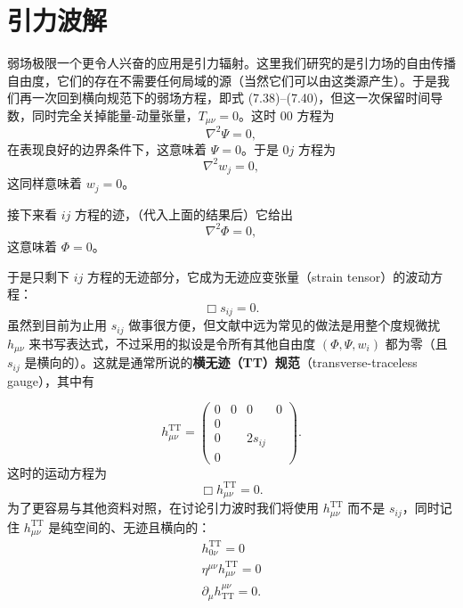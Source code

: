 \section{引力波解}

弱场极限一个更令人兴奋的应用是引力辐射。这里我们研究的是引力场的自由传播自由度，它们的存在不需要任何局域的源（当然它们可以由这类源产生）。于是我们再一次回到横向规范下的弱场方程，即式 (7.38)--(7.40)，但这一次保留时间导数，同时完全关掉能量-动量张量，$T_{\mu\nu} = 0$。这时 00 方程为
\begin{equation*}
\nabla^2\Psi = 0,
\tag{7.86}
\end{equation*}
在表现良好的边界条件下，这意味着 $\Psi = 0$。于是 $0j$ 方程为
\begin{equation*}
\nabla^2 w_j = 0,
\tag{7.87}
\end{equation*}
这同样意味着 $w_j = 0$。

接下来看 $ij$ 方程的迹，（代入上面的结果后）它给出
\begin{equation*}
\nabla^2\Phi = 0,
\tag{7.88}
\end{equation*}
这意味着 $\Phi = 0$。

于是只剩下 $ij$ 方程的无迹部分，它成为无迹应变张量（strain tensor）的波动方程：
\begin{equation*}
\Box s_{ij} = 0.
\tag{7.89}
\end{equation*}
虽然到目前为止用 $s_{ij}$ 做事很方便，但文献中远为常见的做法是用整个度规微扰 $h_{\mu\nu}$ 来书写表达式，不过采用的拟设是令所有其他自由度 $(\Phi, \Psi, w_i)$ 都为零（且 $s_{ij}$ 是横向的）。这就是通常所说的\textbf{横无迹（TT）规范}（transverse-traceless gauge），其中有


\begin{equation*}
h^{\mathrm{TT}}_{\mu\nu} =
\begin{pmatrix}
0 & 0 & 0 & 0 \\
0 & & & \\
0 & & 2s_{ij} & \\
0 & & &
\end{pmatrix}.
\tag{7.90}
\end{equation*}
这时的运动方程为
\begin{equation*}
\Box h^{\mathrm{TT}}_{\mu\nu} = 0.
\tag{7.91}
\end{equation*}
为了更容易与其他资料对照，在讨论引力波时我们将使用 $h^{\mathrm{TT}}_{\mu\nu}$ 而不是 $s_{ij}$，同时记住 $h^{\mathrm{TT}}_{\mu\nu}$ 是纯空间的、无迹且横向的：
\begin{gather*}
h^{\mathrm{TT}}_{0\nu} = 0 \\
\eta^{\mu\nu}h^{\mathrm{TT}}_{\mu\nu} = 0 \\
\partial_\mu h^{\mu\nu}_{\mathrm{TT}} = 0.
\tag{7.92}
\end{gather*}

